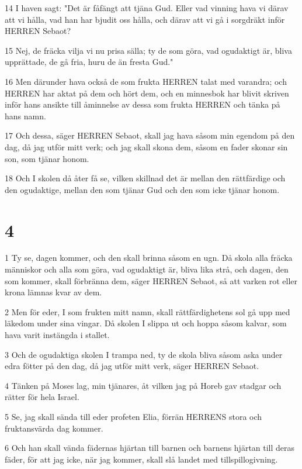 \par 14 I haven sagt: "Det är fåfängt att tjäna Gud. Eller vad vinning hava vi därav att vi hålla, vad han har bjudit oss hålla, och därav att vi gå i sorgdräkt inför HERREN Sebaot?
\par 15 Nej, de fräcka vilja vi nu prisa sälla; ty de som göra, vad ogudaktigt är, bliva upprättade, de gå fria, huru de än fresta Gud."
\par 16 Men därunder hava också de som frukta HERREN talat med varandra; och HERREN har aktat på dem och hört dem, och en minnesbok har blivit skriven inför hans ansikte till åminnelse av dessa som frukta HERREN och tänka på hans namn.
\par 17 Och dessa, säger HERREN Sebaot, skall jag hava såsom min egendom på den dag, då jag utför mitt verk; och jag skall skona dem, såsom en fader skonar sin son, som tjänar honom.
\par 18 Och I skolen då åter få se, vilken skillnad det är mellan den rättfärdige och den ogudaktige, mellan den som tjänar Gud och den som icke tjänar honom.

\chapter{4}

\par 1 Ty se, dagen kommer, och den skall brinna såsom en ugn. Då skola alla fräcka människor och alla som göra, vad ogudaktigt är, bliva lika strå, och dagen, den som kommer, skall förbränna dem, säger HERREN Sebaot, så att varken rot eller krona lämnas kvar av dem.
\par 2 Men för eder, I som frukten mitt namn, skall rättfärdighetens sol gå upp med läkedom under sina vingar. Då skolen I slippa ut och hoppa såsom kalvar, som hava varit instängda i stallet.
\par 3 Och de ogudaktiga skolen I trampa ned, ty de skola bliva såsom aska under edra fötter på den dag, då jag utför mitt verk, säger HERREN Sebaot.
\par 4 Tänken på Moses lag, min tjänares, åt vilken jag på Horeb gav stadgar och rätter för hela Israel.
\par 5 Se, jag skall sända till eder profeten Elia, förrän HERRENS stora och fruktansvärda dag kommer.
\par 6 Och han skall vända fädernas hjärtan till barnen och barnens hjärtan till deras fäder, för att jag icke, när jag kommer, skall slå landet med tillspillogivning.


